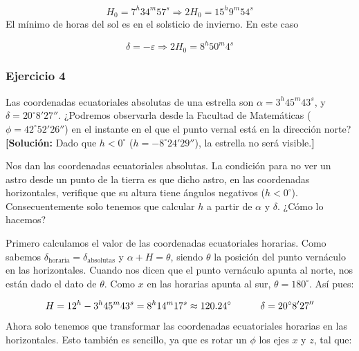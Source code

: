 \begin{equation}
	H_0 = 7^h 34^m 57^s \Rightarrow 2H_0 = 15^h 9^m 54^s
\end{equation}
El mínimo de horas del sol es en el solsticio de invierno.  En este caso

\begin{equation}
	\delta = - \varepsilon \Rightarrow 2H_0 = 8^h 50^m 4^s
\end{equation}


\begin{Enunciado}
	\subsubsection{Ejercicio 4}
	Las coordenadas ecuatoriales absolutas de una estrella son 	$\alpha = 3^{h}45^{m}43^{s}$, y $\delta = 20^\circ8'27''$. ¿Podremos observarla desde la Facultad de Matemáticas ($\phi = 42^\circ52'26''$) en el instante en el que el punto
	vernal está en la dirección norte? \textbf{[Solución:} Dado que $h < 0^\circ$
	($h = -8^\circ24'29''$), la estrella no será visible.\textbf{]}
\end{Enunciado}

Nos dan las coordenadas ecuatoriales absolutas. La condición para no ver un astro desde un punto de la tierra es que dicho astro, en las coordenadas horizontales, verifique que su altura tiene ángulos negativos ($h<0^\circ$). Consecuentemente solo tenemos que calcular $h$ a partir de $\alpha$ y $\delta$. ¿Cómo lo hacemos?

Primero calculamos el valor de las coordenadas ecuatoriales horarias. Como sabemos $\delta_{\mathrm{horaria}} = \delta_{\mathrm{absolutas}}$ y $\alpha+H=\theta$, siendo $\theta$ la posición del punto vernáculo en las horizontales. Cuando nos dicen que el punto vernáculo apunta al norte, nos están dado el dato de $\theta$. Como $x$ en las horarias apunta al sur, $\theta=180^\circ$. Así pues:

\begin{equation}
	H = 12^h - 3^h 45^m 43^s = 8^h 14^m 17^s \approx 120.24^\circ  \quad \quad \quad \delta=20^\circ 8'27''
\end{equation}
Ahora solo tenemos que transformar las coordenadas ecuatoriales horarias en las horizontales. Esto también es sencillo, ya que es rotar un $\phi$ los ejes $x$ y $z$, tal que:

